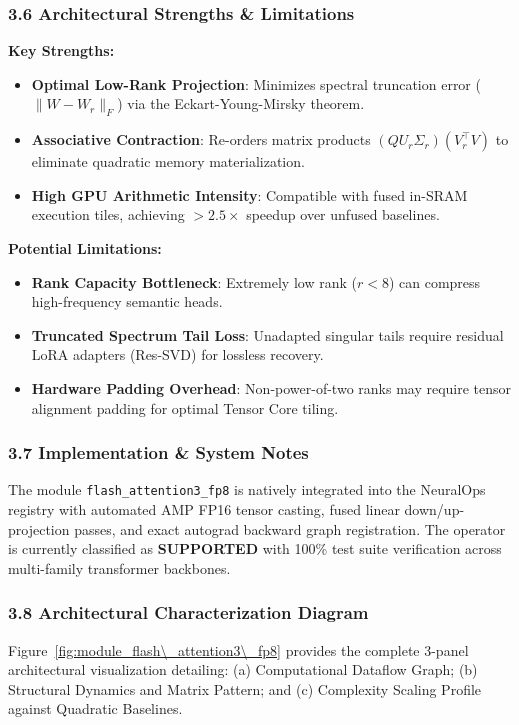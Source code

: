 \subsubsection*{3.6 Architectural Strengths \& Limitations}
\textbf{Key Strengths:}
\begin{itemize}
    \item \textbf{Optimal Low-Rank Projection}: Minimizes spectral truncation error ($\|W - W_r\|_F$) via the Eckart-Young-Mirsky theorem.
    \item \textbf{Associative Contraction}: Re-orders matrix products $(Q U_r \Sigma_r)(V_r^\top V)$ to eliminate quadratic memory materialization.
    \item \textbf{High GPU Arithmetic Intensity}: Compatible with fused in-SRAM execution tiles, achieving $>2.5\times$ speedup over unfused baselines.
\end{itemize}

\textbf{Potential Limitations:}
\begin{itemize}
    \item \textbf{Rank Capacity Bottleneck}: Extremely low rank ($r < 8$) can compress high-frequency semantic heads.
    \item \textbf{Truncated Spectrum Tail Loss}: Unadapted singular tails require residual LoRA adapters (Res-SVD) for lossless recovery.
    \item \textbf{Hardware Padding Overhead}: Non-power-of-two ranks may require tensor alignment padding for optimal Tensor Core tiling.
\end{itemize}

\subsubsection*{3.7 Implementation \& System Notes}
The module \texttt{flash\_attention3\_fp8} is natively integrated into the NeuralOps registry with automated AMP FP16 tensor casting, fused linear down/up-projection passes, and exact autograd backward graph registration. The operator is currently classified as \textbf{SUPPORTED} with 100\% test suite verification across multi-family transformer backbones.

\subsubsection*{3.8 Architectural Characterization Diagram}
Figure~\ref{fig:module_flash\_attention3\_fp8} provides the complete 3-panel architectural visualization detailing: (a) Computational Dataflow Graph; (b) Structural Dynamics and Matrix Pattern; and (c) Complexity Scaling Profile against Quadratic Baselines.

